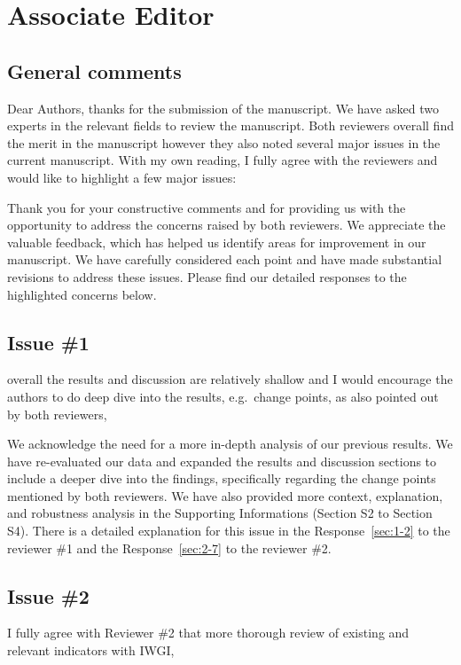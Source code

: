 \section*{Associate Editor}\label{editor}

\subsection{General comments}
\RC{} Dear Authors, thanks for the submission of the manuscript. We have asked two experts in the relevant fields to review the manuscript. Both reviewers overall find the merit in the manuscript however they also noted several major issues in the current manuscript. With my own reading, I fully agree with the reviewers and would like to highlight a few major issues:

\AR{} Thank you for your constructive comments and for providing us with the opportunity to address the concerns raised by both reviewers. We appreciate the valuable feedback, which has helped us identify areas for improvement in our manuscript. We have carefully considered each point and have made substantial revisions to address these issues. Please find our detailed responses to the highlighted concerns below.

\subsection{Issue \#1}
\RC{} overall the results and discussion are relatively shallow and I would encourage the authors to do deep dive into the results, e.g.\ change points, as also pointed out by both reviewers,

\AR{} We acknowledge the need for a more in-depth analysis of our previous results. We have re-evaluated our data and expanded the results and discussion sections to include a deeper dive into the findings, specifically regarding the change points mentioned by both reviewers. We have also provided more context, explanation, and robustness analysis in the Supporting Informations (Section S2 to Section S4). There is a detailed explanation for this issue in the Response~\ref{sec:1-2} to the reviewer \#1 and the Response~\ref{sec:2-7} to the reviewer \#2.

\subsection{Issue \#2}
\RC{} I fully agree with Reviewer \#2 that more thorough review of existing and relevant indicators with IWGI,

